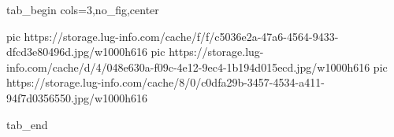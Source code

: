  
 
 
 
 


\ifcmt
  tab_begin cols=3,no_fig,center

     pic https://storage.lug-info.com/cache/f/f/c5036e2a-47a6-4564-9433-dfcd3e80496d.jpg/w1000h616%
		 pic https://storage.lug-info.com/cache/d/4/048e630a-f09c-4e12-9ec4-1b194d015ecd.jpg/w1000h616%
		 pic https://storage.lug-info.com/cache/8/0/c0dfa29b-3457-4534-a411-94f7d0356550.jpg/w1000h616%

  tab_end
\fi
